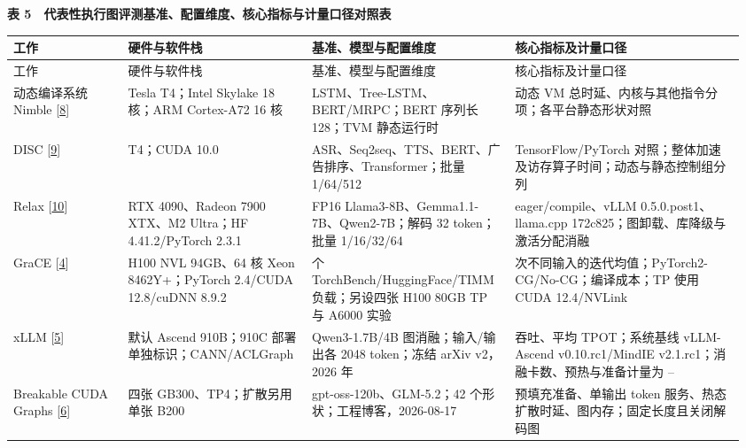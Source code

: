 \documentclass[UTF8,10.5pt,fontset=windows]{ctexart}
\newcommand{\TableTitle}[1]{\par\Needspace{5\baselineskip}\begingroup\centering\bfseries\fontsize{9.5}{13}\selectfont #1\par\endgroup\nobreak}
\begin{document}
\begin{landscape}
\begingroup
\fontsize{8.6}{11.8}\selectfont
\setlength{\tabcolsep}{2.5pt}
\setlength{\emergencystretch}{0.5\linewidth}
\renewcommand{\arraystretch}{1.10}
\TableTitle{\textbf{表 5　代表性执行图评测基准、配置维度、核心指标与计量口径对照表}}
\begin{longtable}[c]{@{}>{\raggedright\arraybackslash}p{0.1536\linewidth}
>{\raggedright\arraybackslash}p{0.2400\linewidth}
>{\raggedright\arraybackslash}p{0.2592\linewidth}
>{\raggedright\arraybackslash}p{0.3072\linewidth}@{}}
\toprule
工作 & 硬件与软件栈 & 基准、模型与配置维度 & 核心指标及计量口径 \\
\midrule\endfirsthead
\toprule
工作 & 硬件与软件栈 & 基准、模型与配置维度 & 核心指标及计量口径 \\
\midrule\endhead
\bottomrule\endfoot
\bottomrule\endlastfoot
动态编译系统 Nimble {[}\protect\hyperlink{ref-shen2021nimble}{8}{]} &
Tesla T4；Intel Skylake 18 核；ARM Cortex-A72 16 核 &
LSTM、Tree-LSTM、BERT/MRPC；BERT 序列长 128；TVM 静态运行时 & 动态 VM
总时延、内核与其他指令分项；各平台静态形状对照 \\
DISC {[}\protect\hyperlink{ref-zhu2021disc}{9}{]} & T4；CUDA 10.0 &
ASR、Seq2seq、TTS、BERT、广告排序、Transformer；批量 1/64/512 &
TensorFlow/PyTorch 对照；整体加速及访存算子时间；动态与静态控制组分列 \\
Relax {[}\protect\hyperlink{ref-lai2025relax}{10}{]} & RTX 4090、Radeon
7900 XTX、M2 Ultra；HF 4.41.2/PyTorch 2.3.1 & FP16
Llama3-8B、Gemma1.1-7B、Qwen2-7B；解码 32 token；批量 1/16/32/64 &
eager/compile、vLLM 0.5.0.post1、llama.cpp
172c825；图卸载、库降级与激活分配消融 \\
GraCE {[}\protect\hyperlink{ref-ghosh2026grace}{4}{]} & H100 NVL
94GB、64 核 Xeon 8462Y+；PyTorch 2.4/CUDA 12.8/cuDNN 8.9.2 & 25 个
TorchBench/HuggingFace/TIMM 负载；另设四张 H100 80GB TP 与 A6000 实验 &
100 次不同输入的迭代均值；PyTorch2-CG/No-CG；编译成本；TP 使用 CUDA
12.4/NVLink \\
xLLM {[}\protect\hyperlink{ref-liu2025xllm}{5}{]} & 默认 Ascend
910B；910C 部署单独标识；CANN/ACLGraph & Qwen3-1.7B/4B
图消融；输入/输出各 2048 token；冻结 arXiv v2，2026 年 & 吞吐、平均
TPOT；系统基线 vLLM-Ascend v0.10.rc1/MindIE
v2.1.rc1；消融卡数、预热与准备计量为 -- \\
Breakable CUDA Graphs
{[}\protect\hyperlink{ref-lmsys2026breakable}{6}{]} & 四张
GB300、TP4；扩散另用单张 B200 & gpt-oss-120b、GLM-5.2；42
个形状；工程博客，2026-08-17 & 预填充准备、单输出 token
服务、热态扩散时延、图内存；固定长度且关闭解码图 \\

\end{longtable}
\end{landscape}
\end{document}
